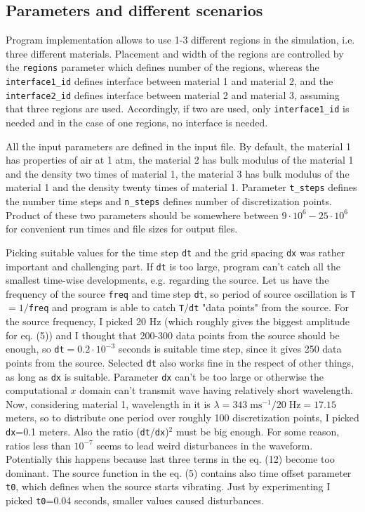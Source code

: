 \documentclass[]{article}
\begin{document}
\subsection{Parameters and different scenarios}
Program implementation allows to use 1-3 different regions in the simulation, i.e. three different materials. Placement and width of the regions are controlled by the \texttt{regions} parameter which defines number of the regions, whereas the \texttt{interface1\_id} defines interface between material 1 and material 2, and the \texttt{interface2\_id} defines interface between material 2 and material 3, assuming that three regions are used. Accordingly, if two are used, only \texttt{interface1\_id} is needed and in the case of one regions, no interface is needed. \par
All the input parameters are defined in the input file. By default, the material 1 has properties of air at 1 atm, the material 2 has bulk modulus of the material 1 and the density two times of material 1, the material 3 has bulk modulus of the material 1 and the density twenty times of material 1. Parameter \texttt{t\_steps} defines the number time steps and \texttt{n\_steps} defines number of discretization points. Product of these two parameters should be somewhere between $9\cdot 10^6-25\cdot 10^6$ for convenient run times and file sizes for output files. \par
Picking suitable values for the time step \texttt{dt} and the grid spacing \texttt{dx} was rather important and challenging part. If \texttt{dt} is too large, program can't catch all the smallest time-wise developments, e.g. regarding the source. Let us have the frequency of the source \texttt{freq} and time step \texttt{dt}, so period of source oscillation is \texttt{T$=1/$freq} and program is able to catch \texttt{T$/$dt} "data points" from the source. For the source frequency, I picked 20 Hz (which roughly gives the biggest amplitude for eq. (5)) and I thought that 200-300 data points from the source should be enough, so \texttt{dt}$=0.2\cdot10^{-3}$ seconds is suitable time step, since it gives 250 data points from the source. Selected \texttt{dt} also works fine in the respect of other things, as long as \texttt{dx} is suitable. Parameter \texttt{dx} can't be too large or otherwise the computational $x$ domain can't transmit wave having relatively short wavelength. Now, considering material 1, wavelength in it is $\lambda=343\;\textrm{ms}^{-1}/20\;\textrm{Hz}=17.15$ meters, so to distribute one period over roughly 100 discretization points, I picked \texttt{dx}=0.1 meters. Also the ratio (\texttt{dt}/\texttt{dx})$^2$ must be big enough. For some reason, ratios less than $10^{-7}$ seems to lead weird disturbances in the waveform. Potentially this happens because last three terms in the eq. (12) become too dominant. The source function in the eq. (5) contains also time offset parameter \texttt{t0}, which defines when the source starts vibrating. Just by experimenting I picked \texttt{t0}=0.04 seconds, smaller values caused disturbances. 
\end{document}
